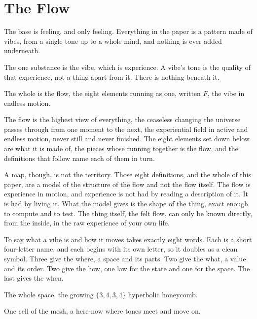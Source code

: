 \section{The Flow}

The base is feeling, and only feeling. Everything in the paper is a pattern made of vibes, from a single tone up to a whole mind, and nothing is ever added underneath.

\begin{axiom}
The one substance is the vibe, which is experience. A vibe's tone is the quality of that experience, not a thing apart from it. There is nothing beneath it.
\end{axiom}

\begin{axiom}
The whole is the flow, the eight elements running as one, written $F$, the vibe in endless motion.
\end{axiom}

The flow is the highest view of everything, the ceaseless changing the universe passes through from one moment to the next, the experiential field in active and endless motion, never still and never finished. The eight elements set down below are what it is made of, the pieces whose running together is the flow, and the definitions that follow name each of them in turn.

A map, though, is not the territory. Those eight definitions, and the whole of this paper, are a model of the structure of the flow and not the flow itself. The flow is experience in motion, and experience is not had by reading a description of it. It is had by living it. What the model gives is the shape of the thing, exact enough to compute and to test. The thing itself, the felt flow, can only be known directly, from the inside, in the raw experience of your own life.

To say what a vibe is and how it moves takes exactly eight words. Each is a short four-letter name, and each begins with its own letter, so it doubles as a clean symbol. Three give the where, a space and its parts. Two give the what, a value and its order. Two give the how, one law for the state and one for the space. The last gives the when.

\begin{definition}[Mesh]
The whole space, the growing $\{3,4,3,4\}$ hyperbolic honeycomb.
\end{definition}

\begin{definition}[Dock]
One cell of the mesh, a here-now where tones meet and move on.
\end{definition}


